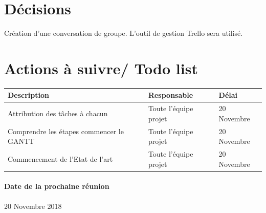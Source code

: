 \documentclass{article}
\begin{document}
\section{Décisions}
Création d'une conversation de groupe. L'outil de gestion Trello sera utilisé.

\section{Actions à suivre/ Todo list}

\begin{tabular}{|C{5cm}|C{3cm}|C{3cm}|}
\hline {} Description & Responsable & Délai \\
\hline  Attribution des tâches à chacun & Toute l'équipe projet  & 20 Novembre  \\
\hline 
Comprendre les étapes  commencer le GANTT & Toute l'équipe projet  & 20 Novembre \\
\hline  Commencement de l'Etat de l'art & Toute l'équipe projet  & 20 Novembre  \\
\hline
\end{tabular}

\paragraph{Date de la prochaine réunion}
20 Novembre 2018
\end{document}
